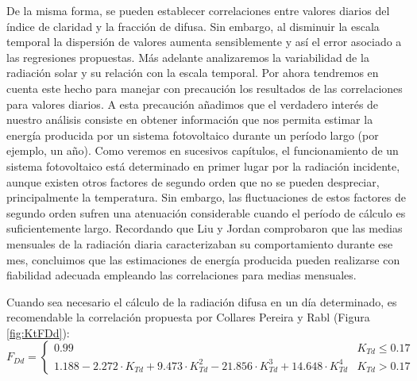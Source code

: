 De la misma forma, se pueden establecer correlaciones entre valores
diarios del índice de claridad y la fracción de difusa. Sin embargo,
al disminuir la escala temporal la dispersión de valores aumenta sensiblemente
y así el error asociado a las regresiones propuestas. Más adelante
analizaremos la variabilidad de la radiación solar y su relación con
la escala temporal. Por ahora tendremos en cuenta este hecho para
manejar con precaución los resultados de las correlaciones para valores
diarios. A esta precaución añadimos que el verdadero interés de nuestro
análisis consiste en obtener información que nos permita estimar la
energía producida por un sistema fotovoltaico durante un período largo
(por ejemplo, un año). Como veremos en sucesivos capítulos, el funcionamiento
de un sistema fotovoltaico está determinado en primer lugar por la
radiación incidente, aunque existen otros factores de segundo orden
que no se pueden despreciar, principalmente la temperatura. Sin embargo,
las fluctuaciones de estos factores de segundo orden sufren una atenuación
considerable cuando el período de cálculo es suficientemente largo.
Recordando que Liu y Jordan comprobaron que las medias mensuales de
la radiación diaria caracterizaban su comportamiento durante ese mes,
concluimos que las estimaciones de energía producida pueden realizarse
con fiabilidad adecuada empleando las correlaciones para medias mensuales. 

Cuando sea necesario el cálculo de la radiación difusa en un día determinado,
es recomendable la correlación propuesta por Collares Pereira y Rabl
\cite{Collares-Pereira.Rabl1979}(Figura \ref{fig:KtFDd}):\begin{equation}
F_{Dd}=\begin{cases}
0.99 & K_{Td}\leq0.17\\
1.188-2.272\cdot K_{Td}+9.473\cdot K_{Td}^{2}-21.856\cdot K_{Td}^{3}+14.648\cdot K_{Td}^{4} & K_{Td}>0.17\end{cases}\label{eq:FDdCollares}\end{equation}

